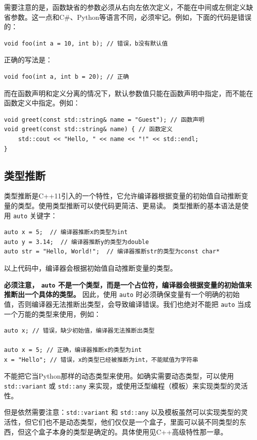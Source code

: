 需要注意的是，函数缺省的参数必须从右向左依次定义，不能在中间或左侧定义缺省参数。这一点和C\#、Python等语言不同，必须牢记。例如，下面的代码是错误的：
\begin{verbatim}
void foo(int a = 10, int b); // 错误，b没有默认值
\end{verbatim}
正确的写法是：
\begin{verbatim}
void foo(int a, int b = 20); // 正确
\end{verbatim}

而在函数声明和定义分离的情况下，默认参数值只能在函数声明中指定，而不能在函数定义中指定。例如：
\begin{verbatim}
void greet(const std::string& name = "Guest"); // 函数声明
void greet(const std::string& name) { // 函数定义
    std::cout << "Hello, " << name << "!" << std::endl;
}
\end{verbatim}

\subsection{类型推断}

类型推断是C++11引入的一个特性，它允许编译器根据变量的初始值自动推断变量的类型。使用类型推断可以使代码更简洁、更易读。
类型推断的基本语法是使用 \texttt{auto} 关键字：
\begin{verbatim}
auto x = 5;  // 编译器推断x的类型为int
auto y = 3.14;  // 编译器推断y的类型为double
auto str = "Hello, World!";  // 编译器推断str的类型为const char*
\end{verbatim}
以上代码中，编译器会根据初始值自动推断变量的类型。

\textbf{必须注意， \texttt{auto} 不是一个类型，而是一个占位符，编译器会根据变量的初始值来推断出一个具体的类型。} 因此，使用 \texttt{auto} 时必须确保变量有一个明确的初始值，否则编译器无法推断出类型，会导致编译错误。我们也绝对不能把 \texttt{auto} 当成一个万能的类型来使用，例如：
\begin{verbatim}
auto x; // 错误，缺少初始值，编译器无法推断出类型

auto x = 5; // 正确，编译器推断x的类型为int
x = "Hello"; // 错误，x的类型已经被推断为int，不能赋值为字符串
\end{verbatim}
不能把它当Python那样的动态类型来使用。如确实需要动态类型，可以使用 \texttt{std::variant} 或 \texttt{std::any} 来实现，或使用泛型编程（模板）来实现类型的灵活性。

但是依然需要注意：\texttt{std::variant} 和 \texttt{std::any} 以及模板虽然可以实现类型的灵活性，但它们也不是动态类型，他们仅仅是一个盒子，里面可以装不同类型的东西，但这个盒子本身的类型是确定的。具体使用见C++高级特性那一章。

